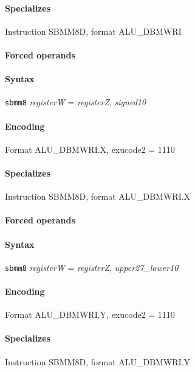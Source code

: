 {\paragraph{Specializes} Instruction SBMM8D, format ALU\_DBMWRI

\paragraph{Forced operands} 

\paragraph{Syntax} \texttt{sbmm8} \emph{registerW} = \emph{registerZ}, \emph{signed10}

\paragraph{Encoding} Format \textsf{ALU\_DBMWRI.X, exucode2 = 1110}\\



\paragraph{Specializes} Instruction SBMM8D, format ALU\_DBMWRI.X

\paragraph{Forced operands} 

\paragraph{Syntax} \texttt{sbmm8} \emph{registerW} = \emph{registerZ}, \emph{upper27\_lower10}

\paragraph{Encoding} Format \textsf{ALU\_DBMWRI.Y, exucode2 = 1110}\\



\paragraph{Specializes} Instruction SBMM8D, format ALU\_DBMWRI.Y

}
